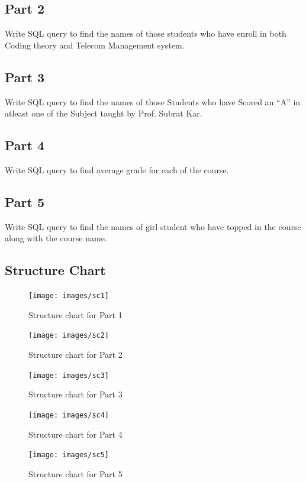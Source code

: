 \documentclass[11pt]{report}
\begin{document}
\subsection{Part 2}
Write SQL query to find the names of those students who have enroll in both Coding theory and Telecom Management system.
\subsection{Part 3}
Write SQL query to find the names of those Students who have Scored an “A” in atleast one of the Subject taught by Prof. Subrat Kar.
\subsection{Part 4}
Write SQL query to find average grade for each of the course.
\subsection{Part 5}
Write SQL query to find the names of girl student who have topped in the course along with the course name.
\pagebreak
\subsection{Structure Chart}
\begin{figure}[h!]
\centering
\texttt{[image: images/sc1]}
\caption{Structure chart for Part 1}	
\end{figure}
\pagebreak
\begin{figure}[h!]
\centering
\texttt{[image: images/sc2]}
\caption{Structure chart for Part 2}	
\end{figure}
\pagebreak
\begin{figure}[h!]
\centering
\texttt{[image: images/sc3]}
\caption{Structure chart for Part 3}	
\end{figure}
\pagebreak
\begin{figure}[h!]
\centering
\texttt{[image: images/sc4]}
\caption{Structure chart for Part 4}	
\end{figure}
\pagebreak
\begin{figure}[h!]
\centering
\texttt{[image: images/sc5]}
\caption{Structure chart for Part 5}	
\end{figure}
\pagebreak
\end{document}
